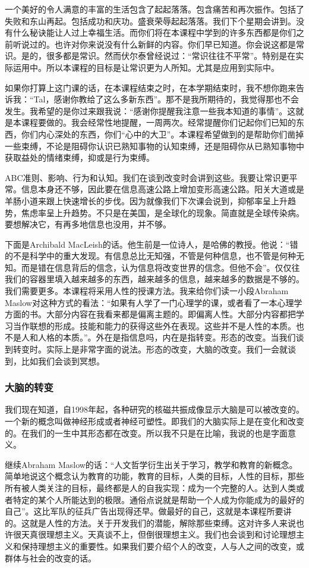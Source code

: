 一个美好的令人满意的丰富的生活包含了起起落落。包含痛苦和再次振作。包括了失败和东山再起。包括成功和庆功。盛衰荣辱起起落落。我们下个星期会讲到。没有什么秘诀能让人过上幸福生活。而你们将在本课程中学到的许多东西都是你们之前听说过的。也许对你来说没有什么新鲜的内容。你们早已知道。你会说这都是常识。是的，很多都是常识。然而伏尔泰曾经说过：“常识往往不平常”。特别是在实际运用中。所以本课程的目标是让常识更为人所知。尤其是应用到实际中。

如果你打算上这门课的话，在本课程结束之时，在本学期结束时，我不想你跑来告诉我：“Tal，感谢你教给了这么多新东西”。那不是我所期待的，我觉得那也不会发生。我希望的是你过来跟我说：“感谢你提醒我注意一些我本知道的事情”。这就是本课程要做的。我会经常性地提醒，一周两次。经常提醒你们记起你们已知的东西，你们内心深处的东西，你们“心中的大卫”。本课程希望做到的是帮助你们凿掉一些束缚，不论是阻碍你认识已熟知事物的认知束缚，还是阻碍你从已熟知事物中获取益处的情绪束缚，抑或是行为束缚。

ABC准则、影响、行为和认知。我们在谈到改变时会讲到这些。我要让常识更平常。信息本身还不够，因此要在信息高速公路上增加变形高速公路。阳关大道或是羊肠小道来跟上快速增长的步伐。因为就像我们下次课会说到，抑郁率呈上升趋势，焦虑率呈上升趋势。不只是在美国，是全球化的现象。简直就是全球传染病。要想解决它，有再多地信息也没用，并不够。 

下面是Archibald MacLeish的话。他生前是一位诗人，是哈佛的教授。他说：“错的不是科学中的重大发现。有信息总比无知强，不管是何种信息，也不管是何种无知。而是错在信息背后的信念，认为信息将改变世界的信念。但他不会”。仅仅往我们的容器里填入越来越多的东西，越来越多的信息，越来越多的数据是不够的。我们需要更多。本课程将采用人性的授课方法。我来给你们读一小段Abraham Maslow对这种方式的看法：“如果有人学了一门心理学的课，或者看了一本心理学方面的书。大部分内容在我看来都是偏离主题的。即偏离人性。大部分内容都把学习当作联想的形成。技能和能力的获得这些外在表现。这些并不是人性的本质。也不是人和人格的本质。”。外在是指信息吗，内在是指转变。形态的改变。当我们谈到转变时。实际上是非常字面的说法。形态的改变，大脑的改变。我们一会就谈到，比如我们会谈到冥想。 

\subsubsection{大脑的转变}
我们现在知道，自1998年起，各种研究的核磁共振成像显示大脑是可以被改变的。一个新的概念叫做神经形成或者神经可塑性。即我们的大脑实际上是在变化和改变的。在我们的一生中其形态都在改变。所以我不只是在比喻，我说的也是字面意义。

继续Abraham Maslow的话：“人文哲学衍生出关于学习，教学和教育的新概念。简单地说这个概念认为教育的功能，教育的目标，人类的目标，人性的目标，那些所有被人类关注的目标，最终都是人的自我实现：成为一个完整的人。达到人类或者特定的某个人所能达到的极限。通俗点说就是帮助一个人成为你能成为的最好的自己”。这比军队的征兵广告出现得还早。做最好的自己，这就是本课程所要讲的。这就是人性的方法。关于开发我们的潜能，解除那些束缚。这对许多人来说也许很天真很理想主义。天真谈不上，但倒很理想主义。我们也会谈到和讨论理想主义和保持理想主义的重要性。如果我们要介绍个人的改变，人与人之间的改变，或群体与社会的改变的话。

